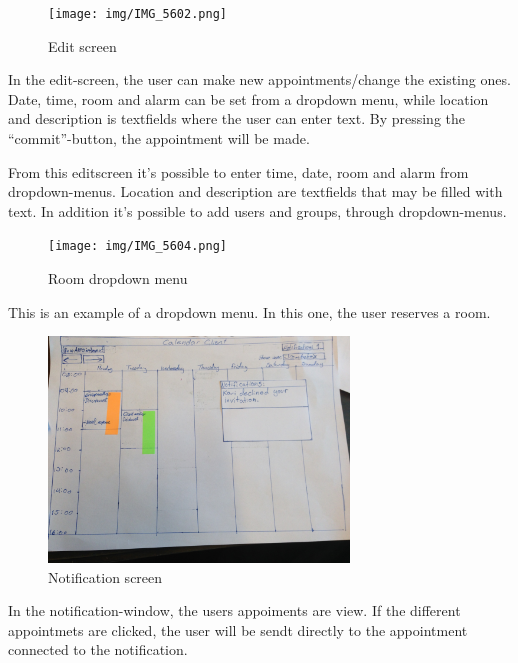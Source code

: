 \documentclass{article}
\begin{document}
\begin{figure}[h!] 
    \begin{center} 
        \texttt{[image: img/IMG\_5602.png]}
        \caption{Edit screen}
    \label{edit}
    \end{center}
\end{figure}
In the edit-screen, the user can make new appointments/change the existing ones. Date, time, room and alarm can be set from a dropdown menu, while location and description is textfields where the user can enter text. By pressing the ``commit''-button, the appointment will be made.

\newpage

From this editscreen it's possible to enter time, date, room and alarm from dropdown-menus. Location and description are textfields that may be filled with text. In addition it's possible to add users and groups, through dropdown-menus.

\newpage

\begin{figure}[h!] 
    \begin{center} 
        \texttt{[image: img/IMG\_5604.png]}
        \caption{Room dropdown menu}
    \label{roomdropdown}
    \end{center}
\end{figure}
This is an example of a dropdown menu. In this one, the user reserves a room.

\newpage

\begin{figure}[h!] 
    \begin{center} 
        \includegraphics[width=8cm]{img/IMG_5608.JPG}
        \caption{Notification screen}
    \label{notificationscreen}
    \end{center}
\end{figure}
In the notification-window, the users appoiments are view. If the different appointmets are clicked, the user will be sendt directly to the appointment connected to the notification.
\end{document}
